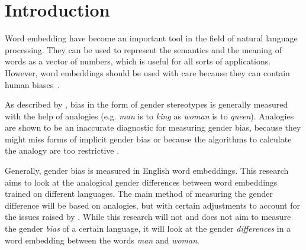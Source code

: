 \section{Introduction}
Word embedding have become an important tool in the field of natural language
processing. They can be used to represent the semantics and the meaning of
words as a vector of numbers, which is useful for all sorts of applications.
However, word embeddings should be used with care because they can contain human
biases~\parencite{caliskan_2017_semantics_language_corpora}.

As described by \textcite{nissim_fair_is_better_2020}, bias in
the form of gender stereotypes is generally measured with the help of analogies (e.g.
\textit{man} is to \textit{king} as \textit{woman} is to \textit{queen}).
Analogies are shown to be an inaccurate diagnostic for measuring gender bias, because
they might miss forms of implicit gender bias \parencite{gonen-goldberg-2019-lipstick-pig}
or because the algorithms to calculate the analogy are too restrictive
\parencite{nissim_fair_is_better_2020}.

Generally, gender bias is measured in English word embeddings. This research aims to
look at the analogical gender differences between word embeddings trained on different
languages. The main method of measuring the gender difference will be based on
analogies, but with certain adjustments to account for the issues raised by
\textcite{nissim_fair_is_better_2020}. While this research will not and does not aim
to measure the gender \textit{bias} of a certain language, it will look at the
gender \textit{differences} in a word embedding between the words \textit{man} and \textit{woman}.
